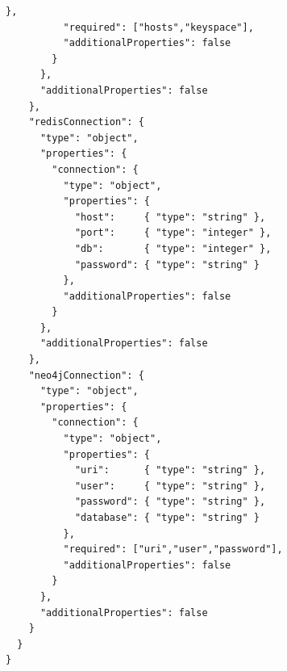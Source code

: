 \begin{lstlisting}[style=jsonstyle]
          },
          "required": ["hosts","keyspace"],
          "additionalProperties": false
        }
      },
      "additionalProperties": false
    },
    "redisConnection": {
      "type": "object",
      "properties": {
        "connection": {
          "type": "object",
          "properties": {
            "host":     { "type": "string" },
            "port":     { "type": "integer" },
            "db":       { "type": "integer" },
            "password": { "type": "string" }
          },
          "additionalProperties": false
        }
      },
      "additionalProperties": false
    },
    "neo4jConnection": {
      "type": "object",
      "properties": {
        "connection": {
          "type": "object",
          "properties": {
            "uri":      { "type": "string" },
            "user":     { "type": "string" },
            "password": { "type": "string" },
            "database": { "type": "string" }
          },
          "required": ["uri","user","password"],
          "additionalProperties": false
        }
      },
      "additionalProperties": false
    }
  }
}
\end{lstlisting}
